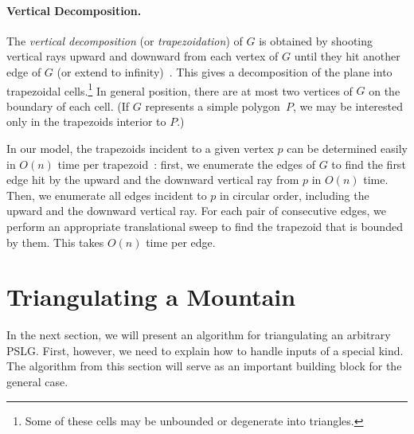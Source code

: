 \documentclass[11pt,a4paper]{article}
\newcommand{\Histogram}{Mountain}
\newcommand{\pslg}{PSLG}
\begin{document}
\paragraph{Vertical Decomposition.}
The \emph{vertical
decomposition} (or \emph{trapezoidation}) of $G$ is
obtained by shooting vertical rays upward and downward from each vertex
of $G$ until they hit another edge of $G$ (or extend to
infinity)~\cite{deBergChvKrOv08}.
This gives a decomposition of the plane into trapezoidal cells.\footnote{Some
of these cells may be unbounded or degenerate into triangles.}
In general position, there are at most two vertices of $G$ on the
boundary of each cell.
(If $G$ represents a simple polygon~$P$, we may be interested
only in the trapezoids interior to $P$.)

In our model,
the trapezoids
incident to a given vertex $p$
can be determined easily in $O(n)$
time per trapezoid~\cite{AsanoMuRoWa11,AsanoMuWa11}: first, we enumerate
the edges of $G$ to find the first edge hit by the upward
and the downward vertical ray from $p$ in $O(n)$ time. Then,
we enumerate all edges incident to $p$ in circular order, including the
upward and the downward vertical ray. For each pair of consecutive edges, we perform an appropriate
translational sweep to find the trapezoid that is bounded by them. This takes $O(n)$ time per
edge.



\section{Triangulating a \Histogram{}}
\label{sec:hist}

In the next section, we will present an algorithm for
triangulating an arbitrary \pslg. First, however,
we need to explain how to handle inputs of a special kind.
The algorithm from this section will serve as an important building
block for the general case.
\end{document}
